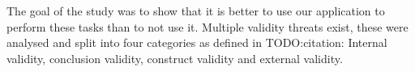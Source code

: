 The goal of the study was to show that it is better to use our application to perform these tasks than to not use it. Multiple validity threats exist, these were analysed and split into four categories as defined in TODO:citation: Internal validity, conclusion validity, construct validity and external validity.
